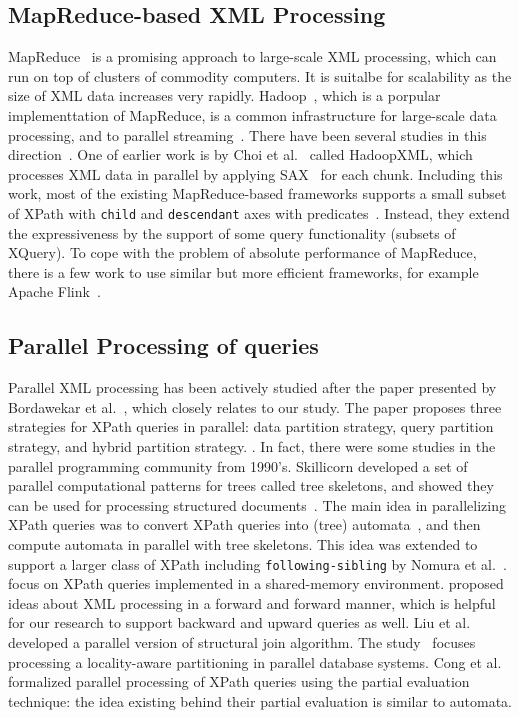 \subsection{MapReduce-based XML Processing} \label{sec:mapreduce}

MapReduce~\cite{DeGh04} is a promising approach to large-scale XML processing,
which can run on top of clusters of commodity computers. It is suitalbe for
scalability as the size of XML data increases very rapidly.
Hadoop~\cite{HadoopWhit12}, which is a porpular implementtation of MapReduce, is
a common infrastructure for large-scale data processing, and to parallel
streaming~\cite{OgTP13,LiZZ17}. There have been several studies in this
direction~\cite{BCMU13,CFKL12,DaGP14,EmIm12,DaGP14,MaMi16}. One of earlier work
is by Choi et al.~\cite{CLKL12} called HadoopXML, which processes XML data in
parallel by applying SAX~\cite{sax} for each chunk. Including this work, most of
the existing MapReduce-based frameworks supports a small subset of XPath with
\texttt{child} and \texttt{descendant} axes with
predicates~\cite{CCMN15,AfDG15,DaGP14,DaGK14}. Instead, they extend the
expressiveness by the support of some query functionality (subsets of XQuery).
To cope with the problem of absolute performance of MapReduce, there is a few
work to use similar but more efficient frameworks, for example Apache
Flink~\cite{CCMN15}.

\subsection{Parallel Processing of queries}

Parallel XML processing has been actively studied after the paper presented by
Bordawekar et al.~\cite{BoLS09}, which closely relates to our study. The paper
proposes three strategies for XPath queries in parallel: data partition
strategy, query partition strategy, and hybrid partition strategy. . In fact,
there were some studies in the parallel programming community from 1990's.
Skillicorn developed a set of parallel computational patterns for trees called
tree skeletons, and showed they can be used for processing structured
documents~\cite{Skil97}. The main idea in parallelizing XPath queries was to
convert XPath queries into (tree) automata~\cite{comon2007tree}, and then
compute automata in parallel with tree skeletons. This idea was extended to
support a larger class of XPath including \texttt{following-sibling} by Nomura
et al.~\cite{NEMH07}. \cite{KrYa10,PLZC07,ZhPC10} focus on XPath queries
implemented in a shared-memory environment. \cite{AAHa11} proposed ideas about
XML processing in a forward and forward manner, which is helpful for our
research to support backward and upward queries as well. Liu et
al.~\cite{LFLQ08} developed a parallel version of structural join algorithm. The
study~\cite{ZaBS15} focuses processing a locality-aware partitioning in parallel
database systems. Cong et al.~\cite{CFKL12} formalized parallel processing of
XPath queries using the partial evaluation technique: the idea existing behind
their partial evaluation is similar to automata.

